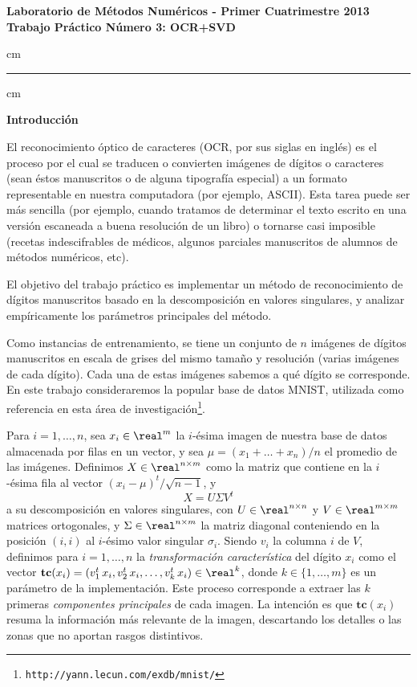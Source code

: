 

%


\begin{centering}
\large\bf Laboratorio de M\'etodos Num\'ericos - Primer Cuatrimestre 2013 \\
\large\bf Trabajo Pr\'actico N\'umero 3: OCR+SVD\\
\end{centering}


 cm
\hrule
{} cm

{\bf Introducci\'on}

El reconocimiento \'optico de caracteres (OCR, por sus siglas en ingl\'es) es el proceso por el cual se traducen o convierten im\'agenes de d\'igitos o caracteres (sean \'estos manuscritos o de alguna tipograf\'ia especial) a un formato representable en nuestra computadora (por ejemplo, ASCII). Esta tarea puede ser m\'as sencilla (por ejemplo, cuando tratamos de determinar el texto escrito en una versi\'on escaneada a buena resoluci\'on de un libro) o tornarse casi imposible (recetas indescifrables de m\'edicos, algunos parciales manuscritos de alumnos de m\'etodos num\'ericos, etc).

El objetivo del trabajo pr\'actico es implementar un m\'etodo de reconocimiento de d\'igitos manuscritos basado en la descomposici\'on en valores singulares, y analizar emp\'iricamente los par\'ametros principales del m\'etodo.

Como instancias de entrenamiento, se tiene un conjunto de $n$ im\'agenes de d\'igitos ma\-nus\-cri\-tos en escala de grises del mismo tama\~no y resoluci\'on (varias im\'agenes de cada d\'igito). Cada una de estas im\'agenes sabemos a qu\'e d\'igito se corresponde.
En este trabajo consideraremos la popular base de datos MNIST, utilizada como referencia en esta \'area de investigaci\'on\footnote{\texttt{http://yann.lecun.com/exdb/mnist/}}. 

Para $i = 1,\ldots, n$, sea $x_i \in \real^{m}$ la $i$-\'esima imagen de nuestra base de datos almacenada por filas en un vector, y sea $\mu = (x_1 + \ldots + x_n)/n$ el promedio de las im\'agenes. Definimos $X\in\real^{n\times m}$ como la matriz que contiene en la $i$-\'esima fila al vector $(x_i - \mu)^{t}/\sqrt{n-1}$, y $$X=U \Sigma V^t$$ a su descomposici\'on en valores singulares, con $U\in\real^{n\times n}$ y $V\in\real^{m\times m}$ matrices ortogonales, y $\Sigma\in\real^{n\times m}$ la matriz diagonal conteniendo en la posici\'on $(i,i)$ al $i$-\'esimo valor singular $\sigma_i$.
Siendo $v_i$ la columna $i$ de $V$, definimos para $i = 1,\ldots,n$ la \textsl{transformaci\'on caracter\'istica} del d\'igito $x_{i}$ como el vector $\mathbf{tc}(x_i) = (v_1^t\, x_i, v_2^t\, x_i,\ldots,v_k^t\, x_i) \in\real^k$, donde $k \in\{1,\ldots,m\}$ es un par\'ametro de la implementaci\'on. Este proceso corresponde a extraer las $k$ primeras \textit{componentes principales} de cada imagen. La intenci\'on es que $\mathbf{tc}(x_i)$ resuma la informaci\'on m\'as relevante de la imagen, descartando los detalles o las zonas que no aportan rasgos distintivos.


